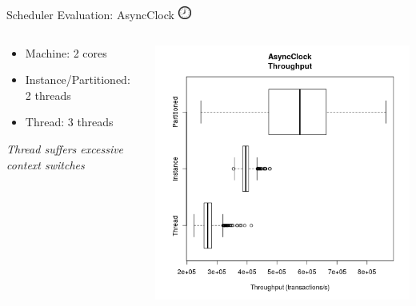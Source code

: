 \documentclass{beamer}
\begin{document}
\begin{frame}{Scheduler Evaluation: AsyncClock \includegraphics[height=12pt]{CLOCK01-300px.png}}

  \begin{columns}
    \begin{column}{.4\textwidth}
      \begin{itemize}
      \item Machine:  2 cores
      \item Instance/Partitioned:  2 threads
      \item Thread:  3 threads
      \end{itemize}

      \vspace*{8pt}

      \emph{Thread suffers excessive context switches}
    \end{column}
    \begin{column}{.6\textwidth}
      \includegraphics[width=.6\textheight]{async_throughput_box.png}
    \end{column}
  \end{columns}

  \vspace*{12pt}


\end{frame}
\end{document}
